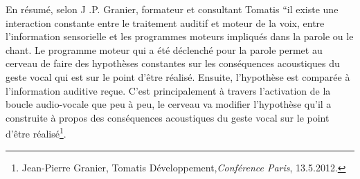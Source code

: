 

En résumé, selon J .P. Granier, formateur et consultant Tomatis ``il existe une interaction
constante entre le traitement auditif et moteur de la
voix, entre l'information sensorielle et les programmes moteurs impliqués
dans la parole ou le chant. Le programme moteur qui a été déclenché
pour la parole permet au cerveau de faire des hypothèses constantes
sur les conséquences acoustiques du geste vocal qui est sur le point
d'être réalisé. Ensuite, l'hypothèse est comparée à l'information
auditive reçue. C'est principalement à travers l'activation de la
boucle audio-vocale que peu à peu, le cerveau va modifier l'hypothèse
qu'il a construite à propos des conséquences acoustiques du geste
vocal sur le point d'être réalisé\footnote{Jean-Pierre Granier, Tomatis Développement,\emph{Conférence Paris}, 13.5.2012.}.
